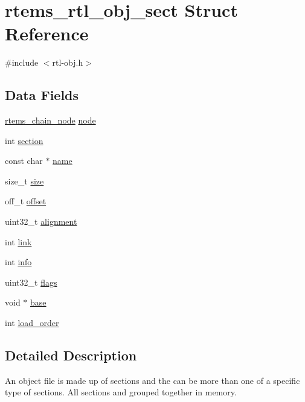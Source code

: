 \hypertarget{structrtems__rtl__obj__sect}{}\section{rtems\+\_\+rtl\+\_\+obj\+\_\+sect Struct Reference}
\label{structrtems__rtl__obj__sect}


{\ttfamily \#include $<$rtl-\/obj.\+h$>$}

\subsection*{Data Fields}
\begin{DoxyCompactItemize}
\item 
\mbox{\hyperlink{structChain__Node__struct}{rtems\+\_\+chain\+\_\+node}} \mbox{\hyperlink{structrtems__rtl__obj__sect_af3950daa285dfa6f3e7e05393f5b35b3}{node}}
\item 
int \mbox{\hyperlink{structrtems__rtl__obj__sect_a4316836ed0e81dd217e51bf819643cf9}{section}}
\item 
const char $\ast$ \mbox{\hyperlink{structrtems__rtl__obj__sect_a2d2323442938d67bab72e6cd6bc32dc8}{name}}
\item 
size\+\_\+t \mbox{\hyperlink{structrtems__rtl__obj__sect_ad415a9c050534349dfce362f840cb3f5}{size}}
\item 
off\+\_\+t \mbox{\hyperlink{structrtems__rtl__obj__sect_a0b4dabc29722d66802e1c57f9ac3f064}{offset}}
\item 
uint32\+\_\+t \mbox{\hyperlink{structrtems__rtl__obj__sect_ac7c7a7bbc7d6463139c1bc96e8a62ee7}{alignment}}
\item 
int \mbox{\hyperlink{structrtems__rtl__obj__sect_aecd47d51375b515e617bd80115b00924}{link}}
\item 
int \mbox{\hyperlink{structrtems__rtl__obj__sect_a4f9cc0dd0411f4cf113fb23620266bab}{info}}
\item 
uint32\+\_\+t \mbox{\hyperlink{structrtems__rtl__obj__sect_a64e0c2d4d5e4bfd8ab5da83c8e068865}{flags}}
\item 
void $\ast$ \mbox{\hyperlink{structrtems__rtl__obj__sect_ae45cf032ba8e8a99cc9b9375a5d72cd4}{base}}
\item 
int \mbox{\hyperlink{structrtems__rtl__obj__sect_af144386cf9ba713fb613e4d657119d9a}{load\+\_\+order}}
\end{DoxyCompactItemize}


\subsection{Detailed Description}
An object file is made up of sections and the can be more than one of a specific type of sections. All sections and grouped together in memory. 

